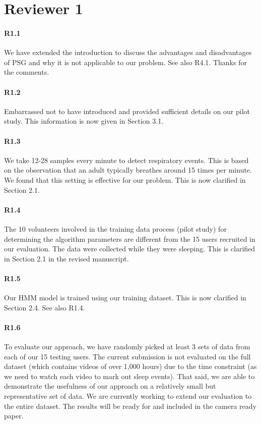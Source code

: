 \section*{Reviewer 1}

\paragraph{R1.1} We have extended the introduction to discuss the advantages and disadvantages of PSG and why it is not applicable to our
problem. See also R4.1. Thanks for the comments.

\paragraph{R1.2} Embarrassed not to have introduced and provided sufficient details on our pilot study. This information is now given in Section 3.1.

\paragraph{R1.3} We take 12-28 samples every minute to detect respiratory events. This is based on the observation that an adult typically
breathes around 15 times per minute. We found that this setting is effective for our problem. This is now clarified in Section 2.1.

\paragraph{R1.4} The 10 volunteers involved in the training data process (pilot study) for determining the algorithm parameters are different from the 15 users recruited in our
evaluation. The data were collected while they were sleeping. This is clarified in Section 2.1 in the revised manuscript.

\paragraph{R1.5} Our HMM model is trained using our training dataset. This is now clarified in Section 2.4. See also R1.4.

\paragraph{R1.6} To evaluate our approach, we have randomly picked at least 3 sets of data from each of our 15 testing users.
The current submission is not evaluated on the full dataset (which contains videos of over 1,000 hours) due to the time constraint (as we
need to watch each video to mark out sleep events). That said, we are able to demonstrate the usefulness of our approach on a relatively
small but representative set of data. We are currently working to extend our evaluation to the entire dataset. The results will be ready
for and included in the camera ready paper.

